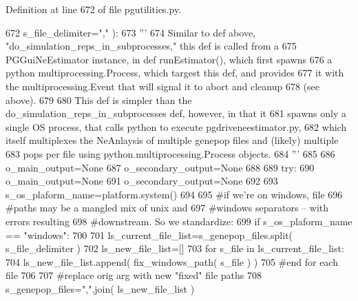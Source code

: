 Definition at line 672 of file pgutilities.\+py.


\begin{DoxyCode}
672                                         s\_file\_delimiter=\textcolor{stringliteral}{","} ):
673     \textcolor{stringliteral}{'''}
674 \textcolor{stringliteral}{    Similar to def above, "do\_simulation\_reps\_in\_subprocesses," this def is called from a}
675 \textcolor{stringliteral}{    PGGuiNeEstimator instance, in def runEstimator(), which first spawns}
676 \textcolor{stringliteral}{    a python multiprocessing.Process, which targest this def, and provides}
677 \textcolor{stringliteral}{    it with the multiprocessing.Event that will signal it to abort and cleanup}
678 \textcolor{stringliteral}{    (see above).}
679 \textcolor{stringliteral}{}
680 \textcolor{stringliteral}{    This def is simpler than the do\_simulation\_reps\_in\_subprocesses def, however, in that it}
681 \textcolor{stringliteral}{    spawns only a single OS process, that calls python to execute pgdriveneestimator.py,}
682 \textcolor{stringliteral}{    which itself multiplexes the NeAnlaysis of multiple genepop files and (likely) multiple}
683 \textcolor{stringliteral}{    pops per file using python.multiprocessing.Process objects.}
684 \textcolor{stringliteral}{    '''}
685 
686     o\_main\_output=\textcolor{keywordtype}{None}
687     o\_secondary\_output=\textcolor{keywordtype}{None}
688 
689     \textcolor{keywordflow}{try}:
690         o\_main\_output=\textcolor{keywordtype}{None}
691         o\_secondary\_output=\textcolor{keywordtype}{None}
692 
693         s\_os\_plaform\_name=platform.system()
694         
695         \textcolor{comment}{#if we're on windows, file}
696         \textcolor{comment}{#paths may be a mangled mix of unix and }
697         \textcolor{comment}{#windows separators -- with errors resulting}
698         \textcolor{comment}{#downstream.  So we standardize:}
699         \textcolor{keywordflow}{if} s\_os\_plaform\_name == \textcolor{stringliteral}{"windows"}:
700 
701             ls\_current\_file\_list=s\_genepop\_files.split( s\_file\_delimiter )
702             ls\_new\_file\_list=[]
703             \textcolor{keywordflow}{for} s\_file \textcolor{keywordflow}{in} ls\_current\_file\_list:
704                 ls\_new\_file\_list.append( fix\_windows\_path( s\_file ) )
705             \textcolor{comment}{#end for each file}
706             
707             \textcolor{comment}{#replace orig arg with new "fixed" file paths}
708             s\_genepop\_files=\textcolor{stringliteral}{","}.join( ls\_new\_file\_list )

\end{DoxyCode}
